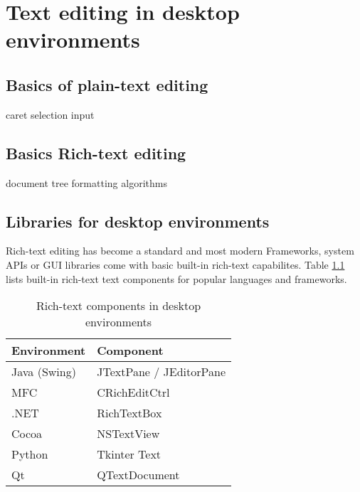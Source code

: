 
\chapter{Text editing in desktop environments}

\section{Basics of plain-text editing} %

caret
selection
input

\section{Basics Rich-text editing} %

document tree
formatting algorithms


\section{Libraries for desktop environments}

Rich-text editing has become a standard and most modern Frameworks, system APIs or GUI libraries come with basic built-in rich-text capabilites. Table \ref{table:rich-text-components-desktop} lists built-in rich-text text components for popular languages and frameworks.

\begin{table}[]
\centering
\begin{tabular}{ll}
\hline
Environment & Component \\ \hline
Java (Swing) & JTextPane / JEditorPane \\
MFC & CRichEditCtrl \\
.NET & RichTextBox \\
Cocoa & NSTextView \\
Python & Tkinter Text \\
Qt & QTextDocument \\ \hline
\end{tabular}
\caption{Rich-text components in desktop environments}
\label{table:rich-text-components-desktop}
\end{table}

